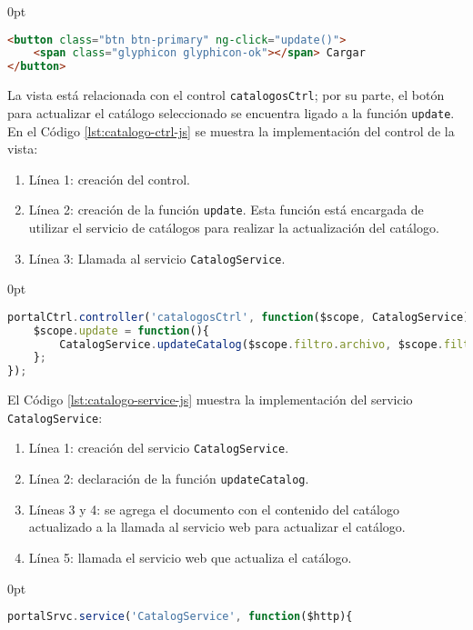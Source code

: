 \begin{enumerate}
\begin{adjustwidth}{\listingfixwidth}{0pt}
\begin{lstlisting}[language=HTML, captionpos=b, caption={Elementos del formulario para seleccionar catálogo.}, label={lst:view-catalog-componentes}]
<button class="btn btn-primary" ng-click="update()">
	<span class="glyphicon glyphicon-ok"></span> Cargar
</button>
\end{lstlisting}
\end{adjustwidth}
La vista está relacionada con el control \texttt{catalogosCtrl}; por su parte, el botón para actualizar el catálogo seleccionado se encuentra ligado a la función \texttt{update}. En el Código \ref{lst:catalogo-ctrl-js} se muestra la implementación del control de la vista:
\begin{enumerate}
	\item Línea 1: creación del control. 
	\item Línea 2: creación de la función \texttt{update}. Esta función está encargada de utilizar el servicio de catálogos para realizar la actualización del catálogo.
	\item Línea 3: Llamada al servicio \texttt{CatalogService}.
\end{enumerate}
\begin{adjustwidth}{\listingfixwidth}{0pt}
\begin{lstlisting}[language=Javascript, caption={Controlador de la vista Catálogo.}, captionpos=b, label={lst:catalogo-ctrl-js}]
portalCtrl.controller('catalogosCtrl', function($scope, CatalogService){
	$scope.update = function(){
		CatalogService.updateCatalog($scope.filtro.archivo, $scope.filtro.catalogo.name);
	};
});
\end{lstlisting}
\end{adjustwidth}
El Código \ref{lst:catalogo-service-js} muestra la implementación del servicio \texttt{CatalogService}:
\begin{enumerate}
	\item Línea 1: creación del servicio \texttt{CatalogService}.
	\item Línea 2: declaración de la función \texttt{updateCatalog}.
	\item Líneas 3 y 4: se agrega el documento con el contenido del catálogo actualizado a la llamada al servicio web para actualizar el catálogo.
	\item Línea 5: llamada el servicio web que actualiza el catálogo.
\end{enumerate}
\begin{adjustwidth}{\listingfixwidth}{0pt}
\begin{lstlisting}[language=Javascript, caption={Servicio para actualizar un catálogo en \textit{AngularJS}.}, captionpos=b, label={lst:catalogo-service-js}]
portalSrvc.service('CatalogService', function($http){

\end{lstlisting}
\end{adjustwidth}
\end{enumerate}
